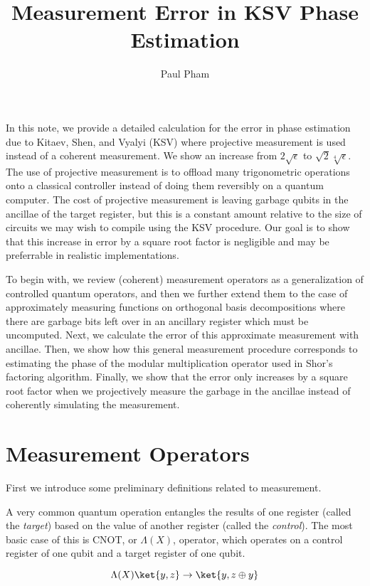 \documentclass{article}
\title{Measurement Error in KSV Phase Estimation}
\author{Paul Pham}
\begin{document}
\maketitle

In this note, we provide a detailed calculation for the error in
phase estimation due to Kitaev, Shen, and Vyalyi (KSV) where projective
measurement is used instead of a coherent measurement. We show an
increase from $2\sqrt{\epsilon}$ to $\sqrt{2}\sqrt[4]{\epsilon}$. The use
of projective measurement is to offload many trigonometric operations
onto a classical controller instead of doing them reversibly on a quantum
computer. The cost of projective measurement is leaving garbage qubits in
the ancillae of the target register, but this is a constant amount relative to
the size of circuits we may wish to compile using the KSV procedure.
Our goal is to show that this increase in error by a square root
factor is negligible and may be preferrable in realistic implementations.

To begin with, we review (coherent) measurement operators as a generalization of
controlled quantum operators, and then we further extend them to the case
of approximately measuring functions on orthogonal basis decompositions
where there are garbage bits left over in an ancillary register which must
be uncomputed.
Next, we calculate the error of this approximate measurement with ancillae.
Then, we show how this general measurement procedure corresponds to
estimating the phase of the modular multiplication operator used in
Shor's factoring algorithm. Finally, we show that the error only
increases by a square root factor when we projectively measure the garbage
in the ancillae instead of coherently simulating the measurement.

\section{Measurement Operators}

First we introduce some preliminary definitions related to measurement.

A very common quantum operation entangles the results of one register
(called the \emph{target}) based on the value of another register (called the
\emph{control}). The most basic case of this is CNOT, or $\Lambda(X)$,
operator, which operates
on a control register of one qubit and a target register of one qubit.

\begin{equation}
\Lambda(X)\ket{y,z} \rightarrow \ket{y, z \oplus y}
\end{equation}
\end{document}
